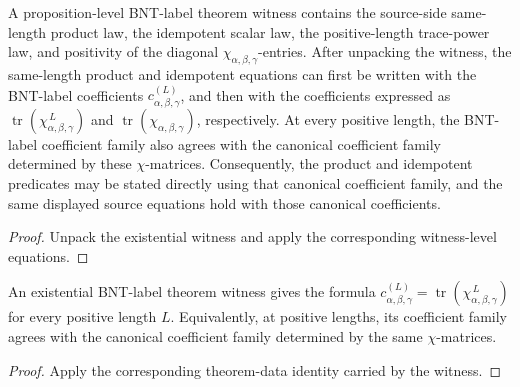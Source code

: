 \begin{theorem}%
    \label{thm:mpdo_has_bnt_label_theorem_witness_source_equations}
    \leanok
    A proposition-level BNT-label theorem witness contains the source-side
    same-length product law, the idempotent scalar law, the positive-length
    trace-power law, and positivity of the diagonal
    $\chi_{\alpha,\beta,\gamma}$-entries. After unpacking the witness, the
    same-length product and idempotent equations can first be written with the
    BNT-label coefficients $c^{(L)}_{\alpha,\beta,\gamma}$, and then with
    the coefficients expressed as
    $\operatorname{tr}(\chi_{\alpha,\beta,\gamma}^{\,L})$ and
    $\operatorname{tr}(\chi_{\alpha,\beta,\gamma})$, respectively. At
    every positive length, the BNT-label coefficient family also agrees with
    the canonical coefficient family determined by these $\chi$-matrices.
    Consequently, the product and idempotent predicates may be stated directly
    using that canonical coefficient family, and the same displayed source
    equations hold with those canonical coefficients.
\end{theorem}
\begin{proof}\leanok
    Unpack the existential witness and apply the corresponding witness-level
    equations.
\end{proof}

\begin{theorem}%
    \label{thm:mpdo_bnt_label_theorem_witness_coeff_eq_trace_pow}
    \leanok
    An existential BNT-label theorem witness gives the formula
    $c_{\alpha,\beta,\gamma}^{(L)}
        = \operatorname{tr}(\chi_{\alpha,\beta,\gamma}^{\,L})$
    for every positive length $L$. Equivalently, at positive lengths, its
    coefficient family agrees with the canonical coefficient family determined
    by the same $\chi$-matrices.
\end{theorem}
\begin{proof}\leanok
    Apply the corresponding theorem-data identity carried by the witness.
\end{proof}

